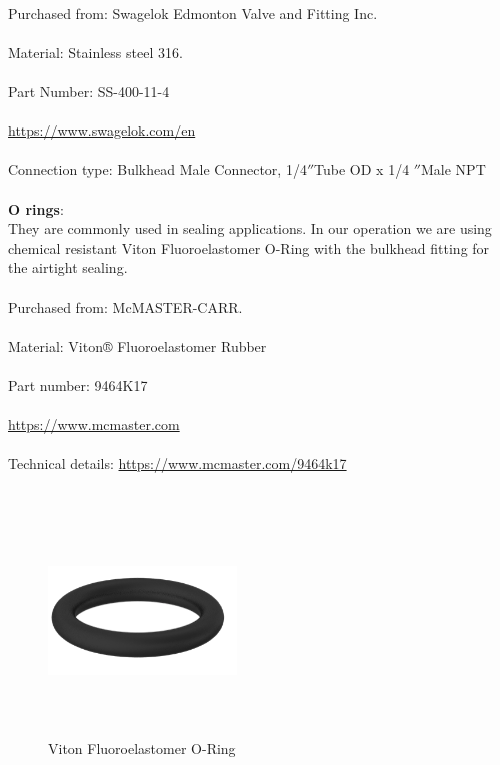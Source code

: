 \\
Purchased from: Swagelok Edmonton Valve and Fitting Inc.\\
\\
Material: Stainless steel 316.   \\                           
\\
Part Number: SS-400-11-4\\
\\
 \url{ https://www.swagelok.com/en}\\
\\
Connection type: Bulkhead Male Connector, 1/4$''$Tube OD x 1/4 $''$Male NPT\\
\\
\textbf{O rings}: 
\\
They are commonly used in sealing applications. In our operation we are using chemical resistant Viton Fluoroelastomer O-Ring with the bulkhead fitting for the airtight sealing.\\
\\
Purchased from: McMASTER-CARR.\\
\\
Material: Viton® Fluoroelastomer Rubber\\                                
\\
Part number: 9464K17\\
\\
\url{https://www.mcmaster.com}\\
\\
Technical details: \url{https://www.mcmaster.com/9464k17}\\
\\
\begin{figure}[!htpb]
  \centering
  \includegraphics[width = 5cm, height=6cm ]{figures/oring}
  \caption{Viton Fluoroelastomer O-Ring}
  \label{fig:oring}
\end{figure}
\\

